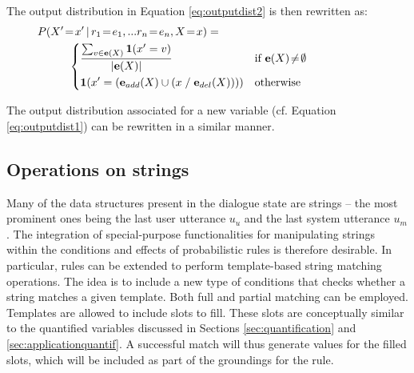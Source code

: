 The output distribution in Equation \eqref{eq:outputdist2} is then rewritten as:
\begin{align}
&P(X'\!=\!x' \, | \, r_1\!=\!e_1,... r_n\!=\!e_n, X\!=\!x) = \hspace{5cm} \nonumber \\ & \; \; \; \; \; \; \; \; \; \;  \begin{dcases} 
\frac{\sum_{v \in {\mathbf{e}(X)}} \mathbf{1}(x' = v)} { |\mathbf{e}(X)| }  & \text{if } \mathbf{e}(X)\!\neq\!\emptyset \\
\mathbf{1}(x' = \left(\mathbf{e}_{add}(X) \cup \left(x \; / \; \mathbf{e}_{del}(X)\right)\right)) & \text{otherwise} \\
\end{dcases}\label{eq:outputdist4}
\end{align} 

The output distribution associated for a new variable (cf. Equation \eqref{eq:outputdist1}) can be rewritten in a similar manner.




\subsection{Operations on strings}

Many of the data structures present in the dialogue state are strings -- the most prominent ones being the last user utterance $u_u$ and the last system utterance $u_m$. The integration of special-purpose functionalities for manipulating strings within the conditions and effects of probabilistic rules is therefore desirable. In particular, rules can be extended to perform template-based string matching operations.  The idea is to include a new type of conditions that checks whether a string matches a given template.  Both full and partial matching can be employed. Templates are allowed to include slots to fill. These slots are conceptually similar to the quantified variables discussed in Sections \ref{sec:quantification} and \ref{sec:applicationquantif}. A successful match will thus generate values for the filled slots, which will be included as part of the groundings for the rule. 

